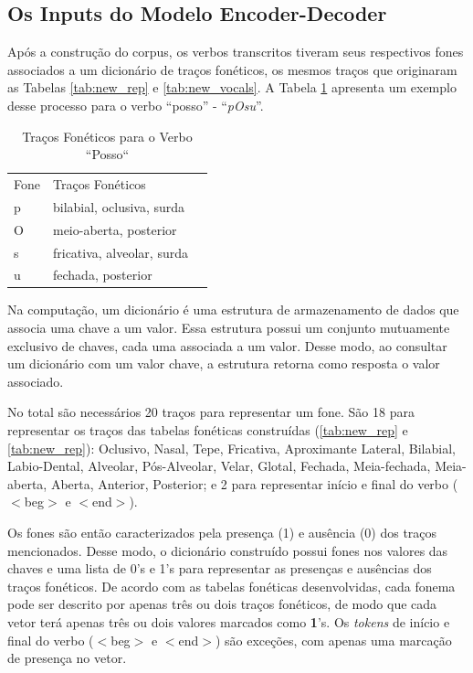 \subsection{Os Inputs do Modelo Encoder-Decoder}
\label{sec:inputs}

Após a construção do corpus, os verbos transcritos tiveram seus respectivos fones associados a um dicionário de traços fonéticos, os mesmos traços que originaram as Tabelas \ref{tab:new_rep} e \ref{tab:new_vocals}. A Tabela \ref{tab:pOsu} apresenta um exemplo desse processo para o verbo “posso” - “\textit{pOsu}”. 

\begin{table}[H]
\begin{center}
\begin{tabular}{lll}
Fone & Traços Fonéticos &  \\ \cline{1-2}
p & bilabial, oclusiva, surda &  \\
O & meio-aberta, posterior &  \\
s & fricativa, alveolar, surda &  \\
u & fechada, posterior & 
\end{tabular}
\end{center}
\caption{Traços Fonéticos para o Verbo “Posso“}
\label{tab:pOsu}
\end{table}

Na computação, um dicionário é uma estrutura de armazenamento de dados que associa uma chave a um valor. Essa estrutura possui um conjunto mutuamente exclusivo de chaves, cada uma associada a um valor. Desse modo, ao consultar um dicionário com um valor chave, a estrutura retorna como resposta o valor associado.

 No total são necessários 20 traços para representar um fone. São 18 para representar os traços das tabelas fonéticas construídas (\ref{tab:new_rep} e \ref{tab:new_rep}): Oclusivo, Nasal, Tepe, Fricativa, Aproximante Lateral, Bilabial, Labio-Dental, Alveolar, Pós-Alveolar, Velar, Glotal, Fechada, Meia-fechada, Meia-aberta, Aberta, Anterior, Posterior; e 2 para representar início e final do verbo ($<$beg$>$ e $<$end$>$).

Os fones são então caracterizados pela presença (1) e ausência (0) dos traços mencionados. Desse modo, o dicionário construído possui fones nos valores das chaves e uma lista de 0's e 1's para representar as presenças e ausências dos traços fonéticos. De acordo com as tabelas fonéticas desenvolvidas, cada fonema pode ser descrito por apenas três ou dois traços fonéticos, de modo que cada vetor terá apenas três ou dois valores marcados como \textbf{1}'s. Os \textit{tokens} de início e final do verbo ($<$beg$>$ e $<$end$>$) são exceções, com apenas uma marcação de presença no vetor. 

